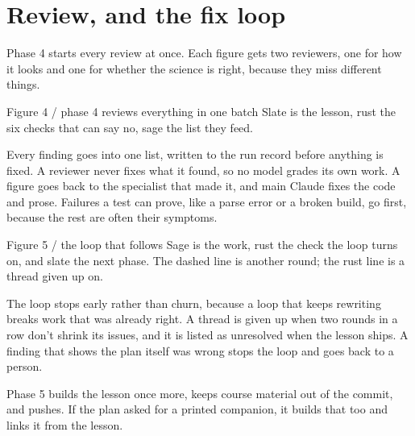 \documentclass[11pt]{article}
\begin{document}
\newpage

\section{Review, and the fix loop}


Phase 4 starts every review at once. Each figure gets two reviewers, one for how it looks and
one for whether the science is right, because they miss different things.

\begin{hsfigure}{Figure 4 / phase 4 reviews everything in one batch}%
{Slate is the lesson, rust the six checks that can say no, sage the list they feed.}
\end{hsfigure}

Every finding goes into one list, written to the run record before anything is fixed. A reviewer
never fixes what it found, so no model grades its own work. A figure goes back to the specialist
that made it, and main Claude fixes the code and prose. Failures a test can prove, like a parse
error or a broken build, go first, because the rest are often their symptoms.

\begin{hsfigure}{Figure 5 / the loop that follows}%
{Sage is the work, rust the check the loop turns on, and slate the next phase. The dashed line
is another round; the rust line is a thread given up on.}
\end{hsfigure}

The loop stops early rather than churn, because a loop that keeps rewriting breaks work that was
already right. A thread is given up when two rounds in a row don't shrink its issues, and it is
listed as unresolved when the lesson ships. A finding that shows the plan itself was wrong stops
the loop and goes back to a person.

Phase 5 builds the lesson once more, keeps course material out of the commit, and pushes. If the
plan asked for a printed companion, it builds that too and links it from the lesson.
\end{document}
